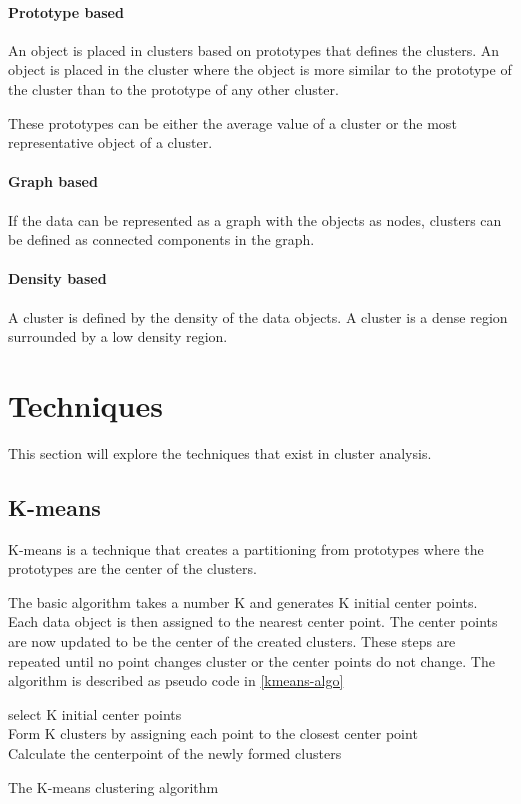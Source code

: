 \paragraph{Prototype based}
An object is placed in clusters based on prototypes that defines the clusters.
An object is placed in the cluster where the object is more similar to the prototype of the cluster than to the prototype of any other cluster.

These prototypes can be either the average value of a cluster or the most representative object of a cluster.

\paragraph{Graph based}
If the data can be represented as a graph with the objects as nodes, clusters can be defined as connected components in the graph.

\paragraph{Density based}
A cluster is defined by the density of the data objects.
A cluster is a dense region surrounded by a low density region.

\section{Techniques}

This section will explore the techniques that exist in cluster analysis.

\subsection{K-means}

K-means is a technique that creates a partitioning from prototypes where the prototypes are the center of the clusters.

The basic algorithm takes a number K and generates K initial center points.
Each data object is then assigned to the nearest center point.
The center points are now updated to be the center of the created clusters.
These steps are repeated until no point changes cluster or the center points do not change.
The algorithm is described as pseudo code in \cref{kmeans-algo}

\begin{algorithm}
\SetAlgoLined
{}

select K initial center points \\
 {
Form K clusters by assigning each point to the closest center point \\
Calculate the centerpoint of the newly formed clusters \label{recalculate}\\
}
\caption{The K-means clustering algorithm}\label{kmeans-algo}
\end{algorithm}

